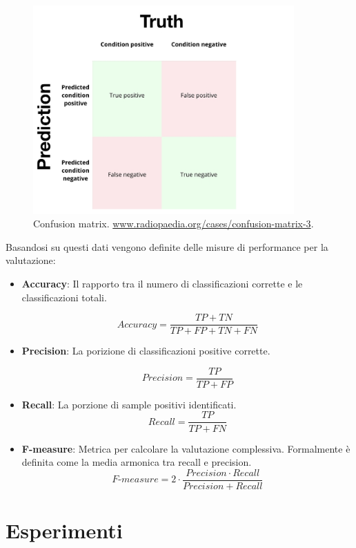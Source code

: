 \documentclass[oneside]{book}
\begin{document}
\begin{figure}[!h]
	\centering
	\includegraphics[width=10cm]{assets/confusion-matrix.jpg}
	\caption{Confusion matrix. \url{www.radiopaedia.org/cases/confusion-matrix-3}.}
	\label{fig:decision-tree}
\end{figure}

Basandosi su questi dati vengono definite delle misure di performance per la valutazione:

\begin{itemize}
	\item \textbf{Accuracy}: Il rapporto tra il numero di classificazioni corrette e le classificazioni totali.
	
	$$Accuracy = \frac{TP + TN}{TP + FP + TN + FN} $$
	
	\item \textbf{Precision}: La porizione di classificazioni positive corrette.
	
	$$Precision = \frac{TP}{TP + FP} $$
		
	\item \textbf{Recall}: La porzione di sample positivi identificati.
	$$Recall = \frac{TP}{TP + FN} $$
	
	
	\item \textbf{F-measure}: Metrica per calcolare la valutazione complessiva. Formalmente è definita come la media armonica tra recall e precision.
	$$F\text{-}measure =  2 \cdot \frac{Precision \cdot Recall}{Precision + Recall} $$
	
\end{itemize}

\section{Esperimenti}
\end{document}
